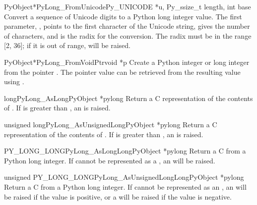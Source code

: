 \begin{cfuncdesc}{PyObject*}{PyLong_FromUnicode}{Py_UNICODE *u,
                                                 Py_ssize_t length, int base}
  Convert a sequence of Unicode digits to a Python long integer
  value.  The first parameter, , points to the first character
  of the Unicode string,  gives the number of characters,
  and  is the radix for the conversion.  The radix must be
  in the range [2, 36]; if it is out of range, 
  will be raised.
\end{cfuncdesc}

\begin{cfuncdesc}{PyObject*}{PyLong_FromVoidPtr}{void *p}
  Create a Python integer or long integer from the pointer .
  The pointer value can be retrieved from the resulting value using
  .
 \end{cfuncdesc}

\begin{cfuncdesc}{long}{PyLong_AsLong}{PyObject *pylong}
  Return a C  representation of the contents of
  .  If  is greater than
  , an 
  is raised.
\end{cfuncdesc}

\begin{cfuncdesc}{unsigned long}{PyLong_AsUnsignedLong}{PyObject *pylong}
  Return a C  representation of the contents of
  .  If  is greater than
  , an
   is raised.
\end{cfuncdesc}

\begin{cfuncdesc}{PY_LONG_LONG}{PyLong_AsLongLong}{PyObject *pylong}
  Return a C  from a Python long integer.  If
   cannot be represented as a , an
   will be raised.
\end{cfuncdesc}

\begin{cfuncdesc}{unsigned PY_LONG_LONG}{PyLong_AsUnsignedLongLong}{PyObject
                                                                 *pylong}
  Return a C  from a Python long integer.
  If  cannot be represented as an , an  will be raised if the value is
  positive, or a  will be raised if the value is
  negative.
\end{cfuncdesc}

